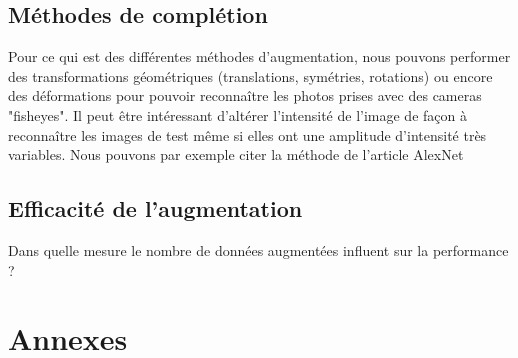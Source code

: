 \documentclass[a4paper,11pt]{article}
\begin{document}
    \subsection{Méthodes de complétion}

	Pour ce qui est des différentes méthodes d'augmentation, nous pouvons performer des
	transformations géométriques (translations, symétries, rotations) ou encore des
	déformations pour pouvoir reconnaître les photos prises avec des cameras "fisheyes".
	Il peut être intéressant d'altérer l'intensité de l'image de façon à reconnaître les images
	de test même si elles ont une amplitude d'intensité très variables. Nous pouvons par exemple
	citer la méthode de l'article AlexNet \cite{einstein}


    \subsection{Efficacité de l'augmentation}

	Dans quelle mesure le nombre de données augmentées influent sur la performance ?

\section{Annexes}


\end{document}
